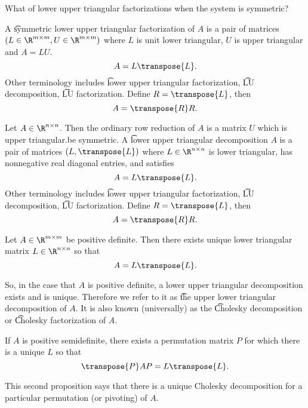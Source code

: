 

What of lower upper triangular factorizations when the system is symmetric?


A \t{symmetric lower upper triangular factorization} of $A$ is a pair of matrices $(L \in \R^{m \times m}, U \in \R^{m \times m})$ where $L$ is unit lower triangular, $U$ is upper triangular and $A = LU$.
\[
  A = L\transpose{L}.
\]
Other terminology includes \t{lower upper triangular factorization}, \t{LU decomposition}, \t{LU factorization}.
Define $R = \transpose{L}$, then
\[
  A = \transpose{R}R.
\]

Let $A \in \R^{n \times n}$.
Then the ordinary row reduction of $A$ is a matrix $U$ which is upper triangular.be symmetric.
A \t{lower upper triangular decomposition}
$A$ is a pair of matrices $(L, \transpose{L})$ where $L \in \R^{n \times n}$ is lower triangular, has nonnegative real diagonal entries, and satisfies
\[
  A = L\transpose{L}.
\]
Other terminology includes \t{lower upper triangular factorization}, \t{LU decomposition}, \t{LU factorization}.
Define $R = \transpose{L}$, then
\[
  A = \transpose{R}R.
\]


\begin{proposition}
  Let $A \in \R^{m \times m}$ be positive definite. Then there exists unique lower triangular matrix $L \in \R^{n \times n}$ so that
  \[
    A = L\transpose{L}.
  \]
\end{proposition}
So, in the case that $A$ is positive definite, a lower upper triangular decomposition exists and is unique.
Therefore we refer to it as \t{the upper lower triangular decomposition} of $A$.
It is also known (universally) as the \t{Cholesky decomposition} or \t{Cholesky factorization} of $A$.

\begin{proposition}
  If $A$ is positive semidefinite, there exists a permutation matrix $P$ for which there is a unique $L$ so that
  \[
    \transpose{P}AP = L\transpose{L}.
  \]
\end{proposition}

This second proposition says that there is a unique Cholesky decomposition for a particular permutation (or pivoting) of $A$.


